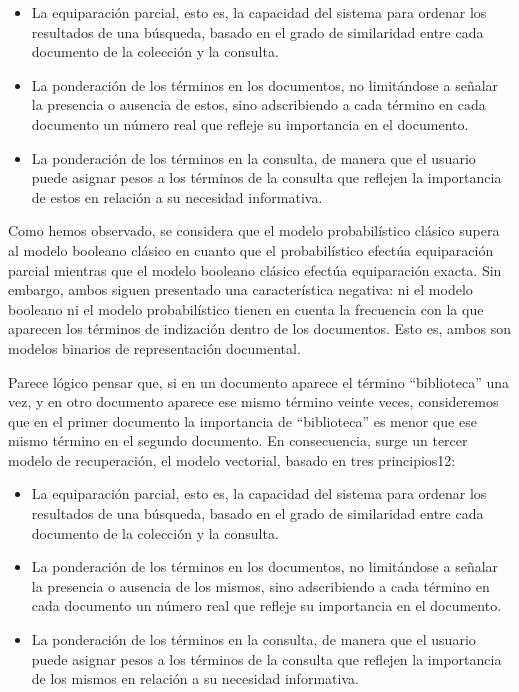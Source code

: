\documentclass{article}
\begin{document}
\begin{itemize}
	\item La equiparación parcial, esto es, la capacidad del sistema para ordenar los resultados de una búsqueda, basado en el grado de similaridad entre cada documento de la colección y la consulta.
	\item La ponderación de los términos en los documentos, no limitándose a señalar la presencia o ausencia de estos, sino adscribiendo a cada término en cada documento un número real que refleje su importancia en el documento.
	\item La ponderación de los términos en la consulta, de manera que el usuario puede asignar pesos a los términos de la consulta que reflejen la importancia de estos en relación a su necesidad informativa.
\end{itemize}

Como hemos observado, se considera que el modelo probabilístico clásico supera al modelo booleano clásico en cuanto que el probabilístico efectúa equiparación parcial mientras que el modelo booleano clásico efectúa equiparación exacta. Sin embargo, ambos siguen presentado una característica negativa: ni el modelo booleano ni el modelo probabilístico tienen en cuenta la frecuencia con la que aparecen los términos de indización dentro de los documentos. Esto es, ambos son modelos binarios de representación documental.

Parece lógico pensar que, si en un documento aparece el término “biblioteca” una vez, y en otro documento aparece ese mismo término veinte veces, consideremos que en el primer documento la importancia de “biblioteca” es menor que ese mismo término en el segundo documento. En consecuencia, surge un tercer modelo de recuperación, el modelo vectorial, basado en tres principios12:

\begin{itemize}
	\item La equiparación parcial, esto es, la capacidad del sistema para ordenar los resultados de una búsqueda, basado en el grado de similaridad entre cada documento de la colección y la consulta.
	\item La ponderación de los términos en los documentos, no limitándose a señalar la presencia o ausencia de los mismos, sino adscribiendo a cada término en cada documento un número real que refleje su importancia en el documento.
	\item La ponderación de los términos en la consulta, de manera que el usuario puede asignar pesos a los términos de la consulta que reflejen la importancia de los mismos en relación a su necesidad informativa.
\end{itemize}
\end{document}
